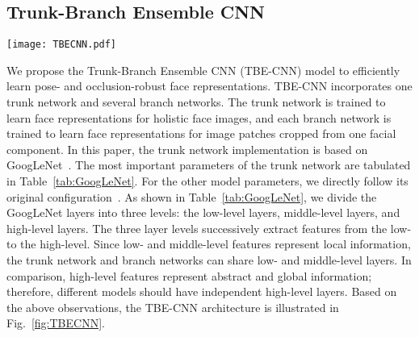 \documentclass[10pt,journal,cspaper,compsoc]{IEEEtran}
\begin{document}
\subsection{Trunk-Branch Ensemble CNN}
\begin{figure*}
\centering
\texttt{[image: TBECNN.pdf]}
\caption{Model architecture for Trunk-Branch Ensemble CNN (TBE-CNN).
Note that a max pooling layer is omitted for simplicity following each convolution module, e.g., Conv1 and Inception 3.
TBE-CNN is composed of one trunk network that learns representations for holistic face images
and two branch networks that learn representations for image patches cropped around facial components.
The trunk network and the branch networks share the same low- and middle-level layers,
and they have individual high-level layers.
The output feature maps of the trunk network and branch networks are fused by concatenation.
The output of the last fully connected layer is utilized as the final face representation of one video frame.
}
\label{fig:TBECNN}
\end{figure*}


We propose the Trunk-Branch Ensemble CNN (TBE-CNN) model to efficiently learn pose- and occlusion-robust face representations.
TBE-CNN incorporates one trunk network and several branch networks.
The trunk network is trained to learn face representations for holistic face images,
and each branch network is trained to learn face representations for image patches cropped from one facial component.
In this paper, the trunk network implementation is based on GoogLeNet~\cite{szegedy2014going}.
The most important parameters of the trunk network are tabulated in Table~\ref{tab:GoogLeNet}.
For the other model parameters, we directly follow its original configuration~\cite{szegedy2014going}.
As shown in Table~\ref{tab:GoogLeNet}, we divide the GoogLeNet layers into three levels:
the low-level layers, middle-level layers, and high-level layers.
The three layer levels successively extract features from the low- to the high-level.
Since low- and middle-level features represent local information, the trunk network and branch networks can share low- and middle-level layers.
In comparison, high-level features represent abstract and global information; therefore, different models should have independent high-level layers.
Based on the above observations, the TBE-CNN architecture is illustrated in Fig.~\ref{fig:TBECNN}.
\end{document}
